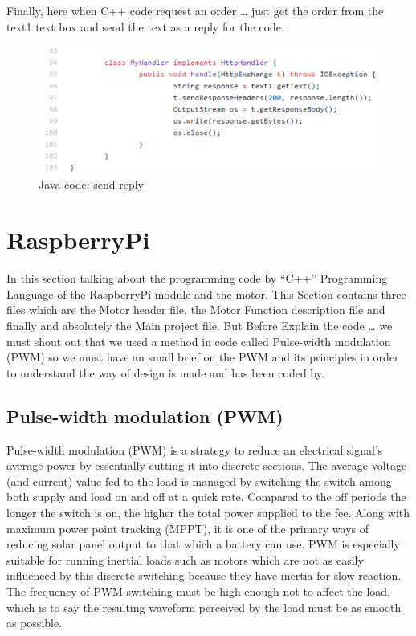 \documentclass{article}
\begin{document}
\newpage

Finally, here when C++ code request an order … just get the order from the text1 text box and send the text as a reply for the code.

\begin{figure}[h]
    \centering
    \includegraphics{figures/49.png}
    \caption{Java code: send reply}
    \label{fig:my_label}
\end{figure}

\newpage

\section{RaspberryPi}

In this section talking about the programming code by “C++” Programming Language of the RaspberryPi module and the motor. This Section contains three files which are the Motor header file, the Motor Function description file and finally and absolutely the Main project file. But Before Explain the code … we must shout out that we used a method in code called Pulse-width modulation (PWM) so we must have an small brief on the PWM and its principles in order to understand the way of design is made and has been coded by.

\subsection{Pulse-width modulation (PWM)}

Pulse-width modulation (PWM) is a strategy to reduce an electrical signal's average power by essentially cutting it into discrete sections. The average voltage (and current) value fed to the load is managed by switching the switch among both supply and load on and off at a quick rate. Compared to the off periods the longer the switch is on, the higher the total power supplied to the fee. Along with maximum power point tracking (MPPT), it is one of the primary ways of reducing solar panel output to that which a battery can use. PWM is especially suitable for running inertial loads such as motors which are not as easily influenced by this discrete switching because they have inertia for slow reaction. The frequency of PWM switching must be high enough not to affect the load, which is to say the resulting waveform perceived by the load must be as smooth as possible.
\end{document}
